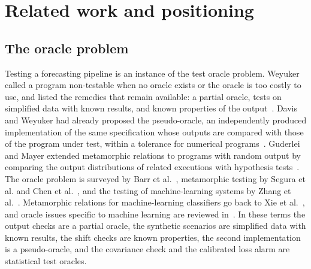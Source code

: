 \documentclass[11pt,a4paper]{article}
\begin{document}


\section{Related work and positioning}
\label{sec:related}

\subsection{The oracle problem}

Testing a forecasting pipeline is an instance of the test oracle problem.
Weyuker called a program non-testable when no oracle exists or the oracle
is too costly to use, and listed the remedies that remain available: a
partial oracle, tests on simplified data with known results, and known
properties of the output~\cite{weyuker1982testing}. Davis and Weyuker
had already proposed the pseudo-oracle, an independently produced implementation of the
same specification whose outputs are compared with those of the program
under test, within a tolerance for numerical programs~\cite{davis1981pseudo}.
Guderlei and Mayer extended metamorphic relations to programs with random
output by comparing the output distributions of related executions with
hypothesis tests~\cite{guderlei2007statistical}. The oracle problem is
surveyed by Barr et al.~\cite{barr2015oracle}, metamorphic testing by
Segura et al. and Chen et al.~\cite{segura2016survey,chen2018metamorphic},
and the testing of machine-learning systems by Zhang
et al.~\cite{zhang2022machine}. Metamorphic relations for machine-learning
classifiers go back to Xie et al.~\cite{xie2011testing}, and oracle issues
specific to machine learning are reviewed in~\cite{seca2021review}.
In these terms the output checks are a partial oracle, the synthetic
scenarios are simplified data with known results, the shift checks are
known properties, the second implementation is a pseudo-oracle, and the
covariance check and the calibrated loss alarm are statistical test
oracles.
\end{document}
